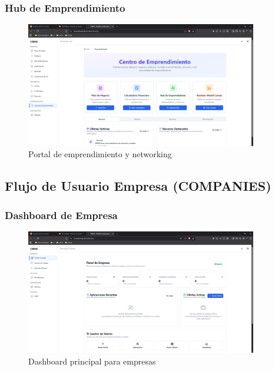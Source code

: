 \documentclass[12pt,a4paper]{article}
\begin{document}
\begin{enumerate}
\subsubsection{Hub de Emprendimiento}
\begin{figure}[H]
    \centering
    \includegraphics[width=0.9\textwidth]{screenshots/youth/entrepreneurship.png}
    \caption{Portal de emprendimiento y networking}
    \label{fig:youth-entrepreneurship}
\end{figure}

\subsection{Flujo de Usuario Empresa (COMPANIES)}

\subsubsection{Dashboard de Empresa}
\begin{figure}[H]
    \centering
    \includegraphics[width=0.9\textwidth]{screenshots/companies/dashboard.png}
    \caption{Dashboard principal para empresas}
    \label{fig:company-dashboard}
\end{figure}


\end{enumerate}
\end{document}
